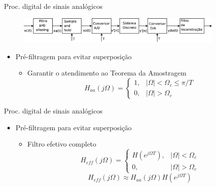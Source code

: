 \documentclass[
size=11pt,
paper=screen,
mode=present,
display=slidesnotes,
style=paintings,
nopagebreaks,
blackslide,
fleqn]{powerdot}
\begin{document}
\begin{slide}{Proc. digital de sinais anal\'ogicos}
 \begin{figure}
      \centering
      \includegraphics[width=0.9\textwidth]{figs/diagrama_completo.eps}
   \end{figure}
\begin{itemize}
   \item Pré-filtragem para evitar superposição
   \begin{itemize}
      \item Garantir o atendimento ao Teorema da Amostragem
      \begin{equation}
         H_{aa}(j\Omega) = \begin{cases}1, & |\Omega|<\Omega_c\leq \pi/T \\ 0, & |\Omega|>\Omega_c                          \end{cases}
      \end{equation}
   \end{itemize}
\end{itemize}
\end{slide}

\begin{slide}{Proc. digital de sinais anal\'ogicos}
\begin{itemize}
 \item Pré-filtragem para evitar superposição
   \begin{itemize}
      \item Filtro efetivo completo
      \begin{equation}
         H_{eff}(j\Omega) = \begin{cases}H(e^{j\Omega T}), & |\Omega|<\Omega_c\\ 0, & |\Omega|>\Omega_c                          \end{cases}
      \end{equation}
      \begin{equation}
         H_{eff}(j\Omega) \approx H_{aa}(j\Omega) H(e^{j\Omega T})
      \end{equation}
   \end{itemize}
\end{itemize}
\end{slide}
\end{document}
